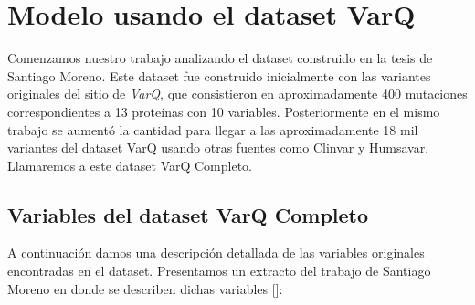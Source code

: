 \section{Modelo usando el dataset VarQ}

Comenzamos nuestro trabajo analizando el dataset construido en la tesis de Santiago Moreno. Este dataset fue construido inicialmente con las variantes originales del sitio de \textit{VarQ}, que consistieron en aproximadamente 400 mutaciones correspondientes a 13 proteínas con 10 variables. Posteriormente en el mismo trabajo se aumentó la cantidad para llegar a las aproximadamente 18 mil variantes del dataset VarQ usando otras fuentes como Clinvar y Humsavar. Llamaremos a este dataset VarQ Completo. 

\subsection{Variables del dataset VarQ Completo}

A continuación damos una descripción detallada de las variables originales encontradas en el dataset. Presentamos un extracto del trabajo de Santiago Moreno en donde se describen dichas variables []: 


